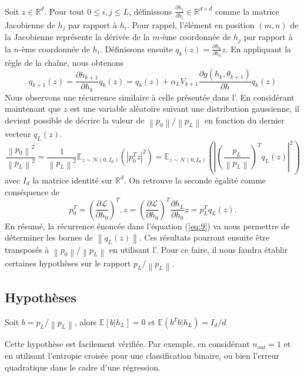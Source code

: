 Soit $z \in \mathbb{R}^d$. Pour tout $0 \leq i, j \leq L$, définissons $\frac{\partial h_j}{\partial h_i} \in \mathbb{R}^{d \times d}$ comme la matrice Jacobienne de $h_j$ par rapport à $h_i$. Pour rappel, l'élément en position $(m, n)$ de la Jacobienne représente la dérivée de la $m$-ème coordonnée de $h_j$ par rapport à la $n$-ème coordonnée de $h_i$. Définissons ensuite $q_k(z) = \frac{\partial h_k}{\partial h_0} z$. En appliquant la règle de la chaîne, nous obtenons
\begin{equation}\label{eq:9}
    q_{k+1}(z) = \frac{\partial h_{k+1}}{\partial h_k} q_k(z) = q_k(z) + \alpha _L V_{k+1} \frac{\partial g(h_k, \theta _{k+1})}{\partial h} q_k(z)
\end{equation}
Nous observons une récurrence similaire à celle présentée dans l'. En considérant maintenant que $z$ est une variable aléatoire suivant une distribution gaussienne, il devient possible de décrire la valeur de $\left\| p_0 \right\| / \left\| p_L \right\|$ en fonction du dernier vecteur $q_L(z)$.
\begin{equation}\label{eq:10}
    \frac{\left\| p_0 \right\| ^2}{\left\| p_L \right\| ^2} = \frac{1}{\left\| p_L \right\| ^2} \mathbb{E}_{z \sim \mathcal{N}(0, I_d)}(\left| p_0^T z  \right| ^2) = \mathbb{E}_{z \sim \mathcal{N}(0, I_d)}(\left| (\frac{p_L}{\left\| p_L \right\| })^T q_L(z) \right| ^2 )
\end{equation}
avec $ I_d $ la matrice identité sur $ \mathbb{R}^d $. On retrouve la seconde égalité comme conséquence de 
\[
    p_0^T = \left(\frac{\partial \mathcal{L}}{\partial h_0} \right)^T, z = (\frac{\partial \mathcal{L}}{\partial h_0} )^T \frac{\partial h_L}{\partial h_0} z = p_L^T  q_L(z)
.\]
En résumé, la récurrence énoncée dans l'équation (\ref{eq:9}) va nous permettre de déterminer les bornes de $\left\| q_L(z) \right\|$. Ces résultats pourront ensuite être transposés à $\left\| p_0 \right\| / \left\| p_L \right\|$ en utilisant l'. Pour ce faire, il nous faudra établir certaines hypothèses sur le rapport $p_L / \left\| p_L \right\|$.

\subsection*{Hypothèses}

\begin{assumption}\label{H3}
    Soit $ b= p_L / \left\| p_L \right\|  $, alors $ \mathbb{E}[b | h_L] = 0 $ et $ \mathbb{E}(b^T b | h_L) = I_d / d $
\end{assumption}
\begin{note}
    Cette hypothèse est facilement vérifiée. Par exemple, en considérant $n_{out} = 1$ et en utilisant l'entropie croisée pour une classification binaire, ou bien l'erreur quadratique dans le cadre d'une régression.
\end{note}

